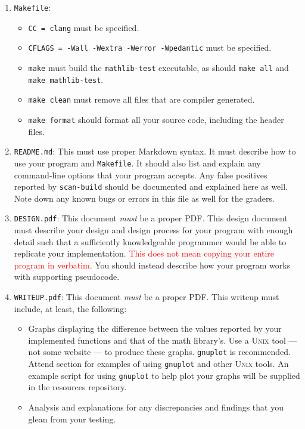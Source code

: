 \begin{enumerate}
  \item \texttt{Makefile}:
    \begin{itemize}
      \item \texttt{CC = clang} must be specified.
      \item \texttt{CFLAGS = -Wall -Wextra -Werror -Wpedantic} must be specified.
      \item \texttt{make} must build the \texttt{mathlib-test}
        executable, as should \texttt{make all} and \texttt{make
        mathlib-test}.
      \item \texttt{make clean} must remove all files that are compiler
        generated.
      \item \texttt{make format} should format all your source code,
        including the header files.
    \end{itemize}
  \item \texttt{README.md}: This must use proper Markdown syntax. It
    must describe how to use your program and \texttt{Makefile}. It
    should also list and explain any command-line options that your
    program accepts. Any false positives reported by \texttt{scan-build}
    should be documented and explained here as well. Note down any known
    bugs or errors in this file as well for the graders.
  \item \texttt{DESIGN.pdf}: This document \emph{must} be a proper
    PDF\@. This design document must describe your design and design
    process for your program with enough detail such that a sufficiently
    knowledgeable programmer would be able to replicate your
    implementation. \textcolor{red}{This does not mean copying your
    entire program in verbatim}. You should instead describe how your
    program works with supporting pseudocode.
  \item \texttt{WRITEUP.pdf}: This document \emph{must} be a proper
    PDF\@. This writeup must include, at least, the following:
      \begin{itemize}
        \item Graphs displaying the difference between the values
          reported by your implemented functions and that of the math
          library's. Use a \textsc{Unix} tool --- not some website ---
          to produce these graphs. \texttt{gnuplot} is recommended.
          Attend section for examples of using \texttt{gnuplot} and
          other \textsc{Unix} tools. An example script for using
          \texttt{gnuplot} to help plot your graphs will be supplied in
          the resources repository.
        \item Analysis and explanations for any discrepancies and
          findings that you glean from your testing.
      \end{itemize}
\end{enumerate}
